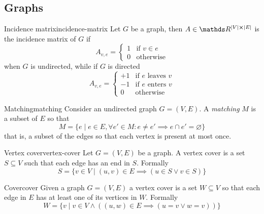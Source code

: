 \documentclass[12pt]{extarticle}
\numberwithin{equation}{subsection}
\begin{document}
\subsection{Graphs}

\begin{definition}{Incidence matrix}{incidence-matrix}
	Let $G$ be a graph, then $A \in \R^{\abs{V} \cross \abs{E}}$ is the incidence matrix of $G$ if
	\begin{equation}
		A_{v, e} = \begin{cases}
			1 & \text{if } v \in e \\
			0 & \text{otherwise}
		\end{cases}
	\end{equation}
	when $G$ is undirected, while if $G$ is directed
	\begin{equation}
		A_{v, e} = \begin{cases}
			+1 & \text{if $e$ leaves $v$} \\
			-1 & \text{if $e$ enters $v$} \\
			0  & \text{otherwise}
		\end{cases}
	\end{equation}
\end{definition}


\begin{definition}{Matching}{matching}
	Consider an undirected graph $G = (V, E)$.
	A \emph{matching} $M$ is a subset of $E$ so that
	\begin{equation}
		M = \{ e \mid e \in E, \forall e' \in M : e \neq e' \implies e \cap e' = \varnothing \}
	\end{equation}
	that is, a subset of the edges so that each vertex is present at most once.
\end{definition}

\begin{definition}{Vertex cover}{vertex-cover}
	Let $G = (V, E)$ be a graph. A vertex cover is a set $S \subseteq V$ such that each edge has an
	end in $S$. Formally
	\begin{equation}
		S = \{ v \in V \mid (u, v) \in E \implies (u \in S \lor v \in S) \}
	\end{equation}
\end{definition}

\begin{definition}{Cover}{cover}
	Given a graph $G = (V, E)$ a vertex cover is a set $W \subseteq V$ so that each edge in
	$E$ has at least one of its vertices in $W$. Formally
	\begin{equation}
		W = \{ v \mid v \in V \land ((u, w) \in E \implies (u = v \lor w = v)) \}
	\end{equation}
\end{definition}
\end{document}
